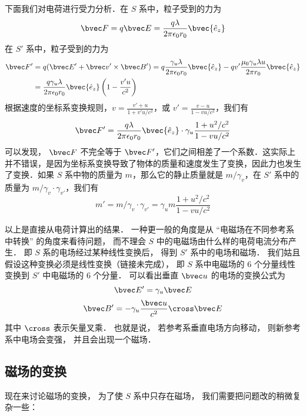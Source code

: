 下面我们对电荷进行受力分析．在 $S$ 系中，粒子受到的力为
\begin{equation}
\bvec F=q\bvec E=\frac{q\lambda}{2\pi\epsilon_0 r_0} \bvec {\hat e_z}
\end{equation}
在 $S'$ 系中，粒子受到的力为
\begin{equation}
\begin{aligned}
\bvec F'&=q(\bvec E'+\bvec v'\times \bvec B')= q\frac{\gamma_u\lambda}{2\pi\epsilon_0 r_0} \bvec {\hat e_z}-qv'\frac{\mu_0\gamma_u \lambda u}{2\pi r_0} \bvec {\hat e_z}
\\
&=\frac{q\gamma_u\lambda}{2\pi\epsilon_0r_0}\bvec {\hat e_z}\left(1-\frac{v' u}{c^2}\right)
\end{aligned}
\end{equation}
根据速度的坐标系变换规则，$v=\frac{v'+u}{1+v'u/c^2}$，或 $v'=\frac{v-u}{1-vu/c^2}$，我们有
\begin{equation}
\bvec F'=\frac{q\lambda}{2\pi\epsilon_0r_0}\bvec {\hat e_z} \cdot\gamma_u\frac{1+u^2/c^2}{1-vu/c^2}
\end{equation}
可以发现， $\bvec F$ 不完全等于 $\bvec F'$，它们之间相差了一个系数．这实际上并不错误，是因为坐标系变换导致了物体的质量和速度发生了变换，因此力也发生了变换．如果 $S$ 系中物的质量为 $m$，那么它的静止质量就是 $m/\gamma_v$，在 $S'$ 系中的质量为 $m/\gamma_v \cdot \gamma_{v'}$，我们有
\begin{equation}
m'=m/\gamma_v\cdot \gamma_{v'}=\gamma_u m \frac{1+u^2/c^2}{1-vu/c^2}
\end{equation}


以上是直接从电荷计算出的结果． 一种更一般的角度是从 “电磁场在不同参考系中转换” 的角度来看待问题， 而不理会 $S$ 中的电磁场由什么样的电荷电流分布产生． 即 $S$ 系的电场经过某种线性变换后， 得到 $S'$ 系中的电场和磁场． 我们姑且假设这种变换必须是线性变换（链接未完成）， 即 $S$ 系中电磁场的 6 个分量线性变换到 $S'$ 中电磁场的 6 个分量． 可以看出垂直 $\bvec u$ 的电场的变换公式为
\begin{equation}\label{EMRef_eq5}
\bvec E' = \gamma_u \bvec E
\end{equation}
\begin{equation}\label{EMRef_eq6}
\bvec B' = -\gamma_u \frac{\bvec u}{c^2} \cross \bvec E
\end{equation}
其中 $\cross$ 表示矢量叉乘． 也就是说， 若参考系垂直电场方向移动， 则新参考系中电场会变强， 并且会出现一个磁场．


\subsection{磁场的变换}
现在来讨论磁场的变换， 为了使 $S$ 系中只存在磁场， 我们需要把问题改的稍微复杂一些：


